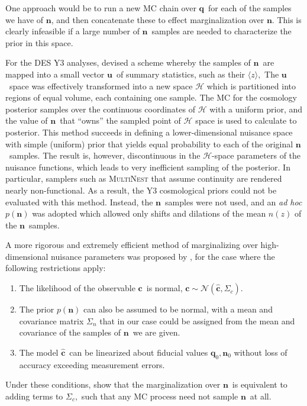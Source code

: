 \documentclass[linenumbers, onecolumn]{aastex631}
\newcommand{\vecc}{\ensuremath{\mathbf{c}}}
\newcommand{\vecq}{\ensuremath{\mathbf{q}}}
\newcommand{\vecn}{\ensuremath{\mathbf{n}}}
\newcommand{\vecu}{\ensuremath{\mathbf{u}}}
\newcommand{\hatc}{\ensuremath{\hat{\mathbf{c}}}}
\begin{document}
One approach would be to run a new MC chain over \vecq\ for each of the samples we have of \vecn, and then concatenate these to effect marginalization over \vecn.  This is clearly infeasible if a large number of \vecn\ samples are needed to characterize the prior in this space.

For the DES Y3 analyses, \citet{hyperrank} devised a scheme whereby the samples of \vecn\ are mapped into a small vector \vecu\ of summary statistics, such as their $\langle z \rangle,$  The \vecu\ space was effectively transformed into a new space $\mathcal{H}$ which is partitioned into regions of equal volume, each containing one sample.  The MC for the cosmology posterior samples over the continuous coordinates of $\mathcal{H}$ with a uniform prior, and the value of \vecn\ that ``owns'' the sampled point of $\mathcal{H}$ space is used to calculate to posterior. This method succeeds in defining a lower-dimensional nuisance space with simple (uniform) prior that yields equal probability to each of the original \vecn\ samples.  The result is, however, discontinuous in the $\mathcal{H}$-space parameters of the nuisance functions, which leads to very inefficient sampling of the posterior.  In particular, samplers such as \textsc{MultiNest} that assume continuity are rendered nearly non-functional.  As a result, the Y3 cosmological priors could not be evaluated with this method.  Instead, the \vecn\ samples were not used, and an \textit{ad hoc} $p(\vecn)$ was adopted which allowed only shifts and dilations of the mean $n(z)$ of the \vecn\ samples.

A more rigorous and extremely efficient method of marginalizing over high-dimensional nuisance parameters was proposed by \citet{hans}, for the case where the following restrictions apply:
\begin{enumerate}
\item The likelihood of the observable \vecc\ is normal, $\vecc \sim \mathcal{N}( \hatc, \Sigma_c).$
\item The prior $p(\vecn)$ can also be assumed to be normal, with a mean and covariance matrix $\Sigma_n$ that in our case could be assigned from the mean and covariance of the samples of \vecn\ we are given.
\item The model \hatc\ can be linearized about fiducial values $\vecq_0, \vecn_0$ without loss of accuracy exceeding measurement errors.
\end{enumerate}
Under these conditions, \citet{hans} show that the marginalization over \vecn\ is equivalent to adding terms to $\Sigma_c,$ such that any MC process need not sample \vecn\ at all.
\end{document}

